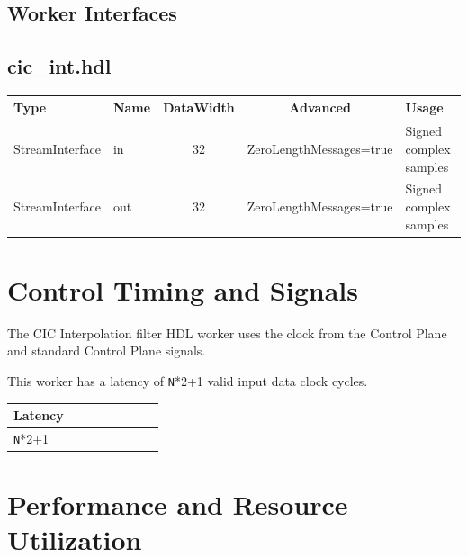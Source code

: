 \documentclass{article}
\def\comp{cic\_int}
\begin{document}
\begin{landscape}
	\section*{Worker Interfaces}
	\subsection*{\comp.hdl}
	\begin{scriptsize}
		\begin{tabular}{|M{2cm}|M{1.5cm}|c|c|M{12cm}|}
			\hline
			Type            & Name & DataWidth & Advanced                & Usage                  \\
			\hline
			StreamInterface & in   & 32        & ZeroLengthMessages=true & Signed complex samples \\
			\hline
			StreamInterface & out  & 32        & ZeroLengthMessages=true & Signed complex samples \\
			\hline
		\end{tabular}
	\end{scriptsize}
\end{landscape}

\section*{Control Timing and Signals}
\begin{flushleft}
	The CIC Interpolation filter HDL worker uses the clock from the Control Plane and standard Control Plane signals.\medskip


	This worker has a latency of \verb+N+*2+1 valid input data clock cycles.\medskip

	\begin{tabular}{|M{4.5cm}|M{4.5cm}|M{1cm}|M{1.5cm}|M{2cm}|M{1cm}|M{1cm}|M{2.5cm}|}
		\hline
		\hline
		Latency         \\
		\hline
		\verb+N+*2+1    \\
		\hline
	\end{tabular}
\end{flushleft}

\section*{Performance and Resource Utilization}
\end{document}
